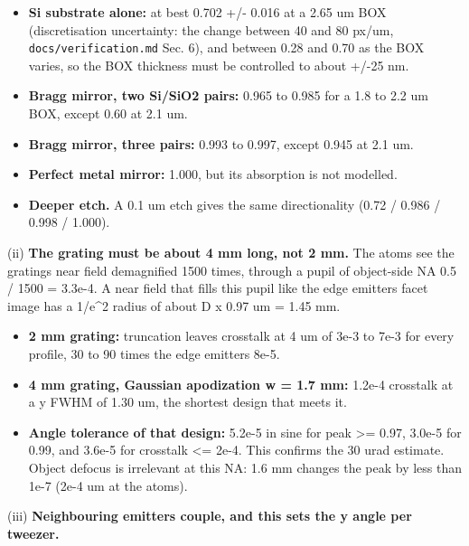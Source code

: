\begin{itemize}
\tightlist
\item
  \textbf{Si substrate alone:} at best 0.702 +/- 0.016 at a 2.65 um BOX
  (discretisation uncertainty: the change between 40 and 80 px/um,
  \texttt{docs/verification.md} Sec. 6), and between 0.28 and 0.70 as
  the BOX varies, so the BOX thickness must be controlled to about +/-25
  nm.
\item
  \textbf{Bragg mirror, two Si/SiO2 pairs:} 0.965 to 0.985 for a 1.8 to
  2.2 um BOX, except 0.60 at 2.1 um.
\item
  \textbf{Bragg mirror, three pairs:} 0.993 to 0.997, except 0.945 at
  2.1 um.
\item
  \textbf{Perfect metal mirror:} 1.000, but its absorption is not
  modelled.
\item
  \textbf{Deeper etch.} A 0.1 um etch gives the same directionality
  (0.72 / 0.986 / 0.998 / 1.000).
\end{itemize}

(ii) \textbf{The grating must be about 4 mm long, not 2 mm.} The atoms
see the grating\textquotesingle s near field demagnified 1500 times,
through a pupil of object-side NA 0.5 / 1500 = 3.3e-4. A near field that
fills this pupil like the edge emitter\textquotesingle s facet image has
a 1/e\^{}2 radius of about D x 0.97 um = 1.45 mm.

\begin{itemize}
\tightlist
\item
  \textbf{2 mm grating:} truncation leaves crosstalk at 4 um of 3e-3 to
  7e-3 for every profile, 30 to 90 times the edge
  emitter\textquotesingle s 8e-5.
\item
  \textbf{4 mm grating, Gaussian apodization w = 1.7 mm:} 1.2e-4
  crosstalk at a y FWHM of 1.30 um, the shortest design that meets it.
\item
  \textbf{Angle tolerance of that design:} 5.2e-5 in sine for peak
  \textgreater= 0.97, 3.0e-5 for 0.99, and 3.6e-5 for crosstalk
  \textless= 2e-4. This confirms the 30 urad estimate. Object defocus is
  irrelevant at this NA: 1.6 mm changes the peak by less than 1e-7 (2e-4
  um at the atoms).
\end{itemize}

(iii) \textbf{Neighbouring emitters couple, and this sets the y angle
per tweezer.}


